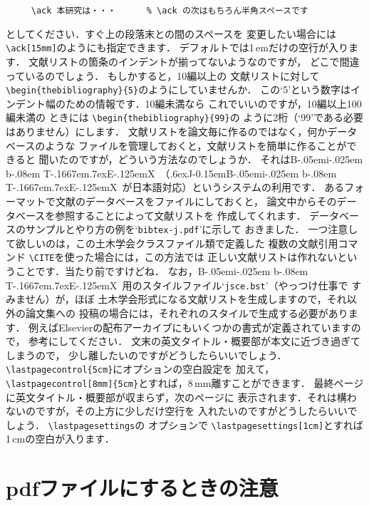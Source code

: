 \documentclass[onecolumn]{jsce}  %
\def\BibTeX{{\rm B\kern-.05em{\sc i\kern-.025em b}\kern-.08em
    T\kern-.1667em\lower.7ex\hbox{E}\kern-.125emX}}
\def\JBibTeX{\leavevmode\lower .6ex\hbox{J}\kern-0.15em\BibTeX}
\begin{document}
\begin{Enumerate}
\renewcommand{\baselinestretch}{0.75}\small\normalsize
\begin{verbatim}
     \ack 本研究は・・・      % \ack の次はもちろん半角スペースです
\end{verbatim}
\renewcommand{\baselinestretch}{1}\small\normalsize
としてください．すぐ上の段落末との間のスペースを
変更したい場合には \verb+\ack[15mm]+のようにも指定できます．
デフォルトでは1\,emだけの空行が入ります．
%
\Qitem 文献リストの箇条のインデントが揃ってないようなのですが，
どこで間違っているのでしょう．
\Aitem もしかすると，10編以上の
文献リストに対して \verb+\begin{thebibliography}{5}+のようにしていませんか．
この`5'という数字はインデント幅のための情報です．10編未満なら
これでいいのですが，10編以上100編未満の
ときには \verb+\begin{thebibliography}{99}+の
ように2桁（`99'である必要はありません）にします．
%
\Qitem 文献リストを論文毎に作るのではなく，何かデータベースのような
ファイルを管理しておくと，文献リストを簡単に作ることができると
聞いたのですが，どういう方法なのでしょうか．
\Aitem それは\BibTeX\ （\JBibTeX\ が日本語対応）というシステムの利用です．
あるフォーマットで文献のデータベースをファイルにしておくと，
論文中からそのデータベースを参照することによって文献リストを
作成してくれます．
データベースのサンプルとやり方の例を`{\tt bibtex-j.pdf}'に示して
おきました．
一つ注意して欲しいのは，この土木学会クラスファイル類で定義した
複数の文献引用コマンド \verb+\CITE+を使った場合には，この方法では
正しい文献リストは作れないということです．当たり前ですけどね．
なお，\BibTeX\ 用のスタイルファイル`{\tt jsce.bst}'（やっつけ仕事で
すみません）が，ほぼ
土木学会形式になる文献リストを生成しますので，それ以外の論文集への
投稿の場合には，それぞれのスタイルで生成する必要があります．
例えばElsevierの配布アーカイブにもいくつかの書式が定義されていますので，
参考にしてください．
%
\Qitem 文末の英文タイトル・概要部が本文に近づき過ぎてしまうので，
少し離したいのですがどうしたらいいでしょう．
\Aitem \verb+\lastpagecontrol{5cm}+にオプションの空白設定を
加えて，\verb+\lastpagecontrol[8mm]{5cm}+とすれば，8\,mm離すことができます．
%
\Qitem 最終ページに英文タイトル・概要部が収まらず，次のページに
表示されます．それは構わないのですが，その上方に少しだけ空行を
入れたいのですがどうしたらいいでしょう．
\Aitem \verb+\lastpagesettings+の
オプションで \verb+\lastpagesettings[1cm]+とすれば1\,cmの空白が入ります．
%
\end{Enumerate}

\section{pdfファイルにするときの注意}
\end{document}
